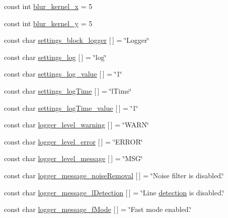 \begin{DoxyCompactItemize}
const int \mbox{\hyperlink{namespaceyenot_a1b60119efa619ee2a1a927d430e984d2}{blur\+\_\+kernel\+\_\+x}} = 5
\item 
const int \mbox{\hyperlink{namespaceyenot_ad178c04ee8518b1553ee1ab5b5054712}{blur\+\_\+kernel\+\_\+y}} = 5
\item 
const char \mbox{\hyperlink{namespaceyenot_a13c8b24e2bbaab0c3bf3fe14e3f495bb}{settings\+\_\+block\+\_\+logger}} \mbox{[}$\,$\mbox{]} = \char`\"{}Logger\char`\"{}
\item 
const char \mbox{\hyperlink{namespaceyenot_ad8a7ef4466cc151f6f380b4c4ccbfa66}{settings\+\_\+log}} \mbox{[}$\,$\mbox{]} = \char`\"{}log\char`\"{}
\item 
const char \mbox{\hyperlink{namespaceyenot_a8e18cd22c222abdaffa0e12b65af2ac5}{settings\+\_\+log\+\_\+value}} \mbox{[}$\,$\mbox{]} = \char`\"{}1\char`\"{}
\item 
const char \mbox{\hyperlink{namespaceyenot_af1e97f87e798dc626f1a437f23b42199}{settings\+\_\+log\+Time}} \mbox{[}$\,$\mbox{]} = \char`\"{}l\+Time\char`\"{}
\item 
const char \mbox{\hyperlink{namespaceyenot_aa1103de8317b20c60b2ae5da7e05f2b3}{settings\+\_\+log\+Time\+\_\+value}} \mbox{[}$\,$\mbox{]} = \char`\"{}1\char`\"{}
\item 
const char \mbox{\hyperlink{namespaceyenot_ab09d0dabe8840893fe9dc4a855ffc2fa}{logger\+\_\+level\+\_\+warning}} \mbox{[}$\,$\mbox{]} = \char`\"{}W\+A\+RN\char`\"{}
\item 
const char \mbox{\hyperlink{namespaceyenot_a9624d76c2385fbb9861e403225b1d698}{logger\+\_\+level\+\_\+error}} \mbox{[}$\,$\mbox{]} = \char`\"{}E\+R\+R\+OR\char`\"{}
\item 
const char \mbox{\hyperlink{namespaceyenot_a536380830aa21975126348216a729b08}{logger\+\_\+level\+\_\+message}} \mbox{[}$\,$\mbox{]} = \char`\"{}M\+SG\char`\"{}
\item 
const char \mbox{\hyperlink{namespaceyenot_a27e7d588bfc41ad2d47d044d4541dad5}{logger\+\_\+message\+\_\+noise\+Removal}} \mbox{[}$\,$\mbox{]} = \char`\"{}Noise filter is disabled.\char`\"{}
\item 
const char \mbox{\hyperlink{namespaceyenot_a7ba035b0bd5ec0ca88a1741671cf6818}{logger\+\_\+message\+\_\+l\+Detection}} \mbox{[}$\,$\mbox{]} = \char`\"{}Line \mbox{\hyperlink{_core_8h_a0ef39a5ada0921b3abf8906957746b86}{detection}} is disabled.\char`\"{}
\item 
const char \mbox{\hyperlink{namespaceyenot_a5cb3756995a6e5a93819405ca99eb35a}{logger\+\_\+message\+\_\+f\+Mode}} \mbox{[}$\,$\mbox{]} = \char`\"{}Fast mode enabled.\char`\"{}

\end{DoxyCompactItemize}

